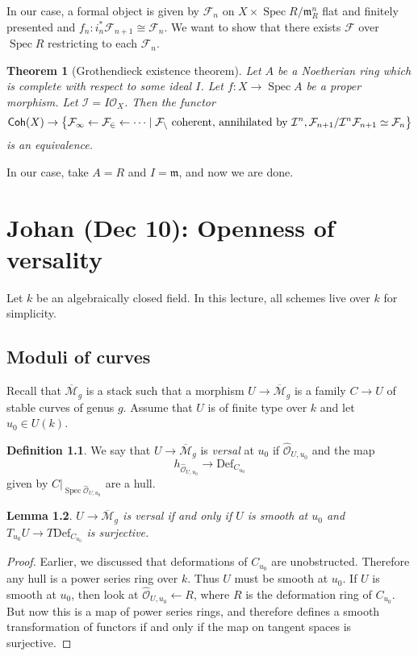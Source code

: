 \documentclass[leqno, openany]{memoir}
\newtheorem{thm}{Theorem}[section]
\newtheorem{lem}[thm]{Lemma}
\theoremstyle{definition}
\newtheorem{defn}[thm]{Definition}
\theoremstyle{remark}
\theoremstyle{plain}
\theoremstyle{definition}
\theoremstyle{remark}
\newcommand{\mc}[1]{\mathcal{#1}}
\newcommand{\mf}[1]{\mathfrak{#1}}
\newcommand{\mr}[1]{\mathrm{#1}}
\newcommand{\ms}[1]{\mathsf{#1}}
\newcommand{\ol}[1]{\overline{#1}}
\newcommand{\wh}[1]{\widehat{#1}}
\DeclareMathOperator{\Spec}{Spec}
\begin{document}
In our case, a formal object is given by $\mc{F}_n$ on $X \times \Spec R/\mf{m}_R^n$ flat and finitely presented and $f_n \colon i_n^* \mc{F}_{n+1} \cong \mc{F}_n$. We want to show that there exists $\mc{F}$ over $\Spec R$ restricting to each $\mc{F}_n$.

\begin{thm}[Grothendieck existence theorem]
    Let $A$ be a Noetherian ring which is complete with respect to some ideal $I$. Let $f \colon X \to \Spec A$ be a proper morphism. Let $\mc{I} = I \mc{O}_X$. Then the functor 
    \[ \ms{Coh}(X) \to \qty{\mc{F_1} \gets \mc{F_2} \gets \cdots \mid \mc{F_n} \text{ coherent, annihilated by $\mc{I}^n$}, \mc{F}_{n+1} / \mc{I}^n \mc{F}_{n+1} \simeq \mc{F}_n} \]
    is an equivalence.
\end{thm}

In our case, take $A = R$ and $I = \mf{m}$, and now we are done.

\chapter{Johan (Dec 10): Openness of versality}%
\label{cha:johan_dec_10_openness_of_versality}

Let $k$ be an algebraically closed field. In this lecture, all schemes live over $k$ for simplicity. 

\section{Moduli of curves}%
\label{sec:moduli_of_curves}

Recall that $\ol{\mc{M}}_g$ is a stack such that a morphism $U \to \ol{\mc{M}}_g$ is a family $C \to U$ of stable curves of genus $g$. Assume that $U$ is of finite type over $k$ and let $u_0 \in U(k)$.

\begin{defn}
    We say that $U \to \ol{\mc{M}}_g$ is \textit{versal} at $u_0$ if $\wh{\mc{O}}_{U, u_0}$ and the map
    \[ h_{\wh{\mc{O}}_{U, u_0}} \to \mr{Def}_{C_{u_0}} \]
    given by $C|_{\Spec \wh{\mc{O}}_{U, u_0}}$ are a hull.
\end{defn}

\begin{lem}
    $U \to \ol{\mc{M}}_g$ is versal if and only if $U$ is smooth at $u_0$ and $T_{u_0} U \to T \mr{Def}_{C_{u_0}}$ is surjective.
\end{lem}

\begin{proof}
    Earlier, we discussed that deformations of $C_{u_0}$ are unobstructed. Therefore any hull is a power series ring over $k$. Thus $U$ must be smooth at $u_0$. If $U$ is smooth at $u_0$, then look at $\wh{\mc{O}}_{U, u_0} \gets R$, where $R$ is the deformation ring of $C_{u_0}$. But now this is a map of power series rings, and therefore defines a smooth transformation of functors if and only if the map on tangent spaces is surjective.
\end{proof}
\end{document}

